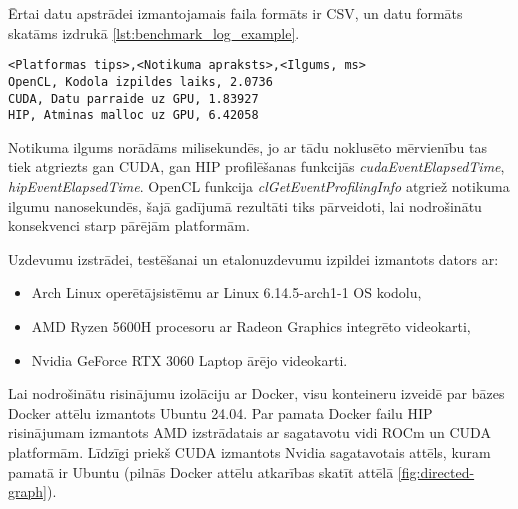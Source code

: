 Ērtai datu apstrādei izmantojamais faila formāts ir CSV, un datu formāts
skatāms izdrukā \ref{lst:benchmark_log_example}.
\begin{lstlisting}[caption={Etalonuzdevuma žurnālfaila ieraksta formāts},
  label=lst:benchmark_log_example,
  captionpos=b
]
<Platformas tips>,<Notikuma apraksts>,<Ilgums, ms>
OpenCL, Kodola izpildes laiks, 2.0736
CUDA, Datu parraide uz GPU, 1.83927
HIP, Atminas malloc uz GPU, 6.42058
\end{lstlisting}

Notikuma ilgums norādāms milisekundēs, jo ar tādu noklusēto mērvienību tas tiek
atgriezts gan CUDA, gan HIP profilēšanas funkcijās
\textit{cudaEventElapsedTime}, \textit{hipEventElapsedTime}. OpenCL funkcija
\textit{clGetEventProfilingInfo} atgriež notikuma ilgumu nanosekundēs, šajā
gadījumā rezultāti tiks pārveidoti, lai nodrošinātu konsekvenci starp pārējām
platformām.

Uzdevumu izstrādei, testēšanai un etalonuzdevumu izpildei izmantots dators ar:
\begin{itemize}
    \item Arch Linux operētājsistēmu ar Linux 6.14.5-arch1-1 OS kodolu,
    \item AMD Ryzen 5600H procesoru ar Radeon Graphics integrēto videokarti,
    \item Nvidia GeForce RTX 3060 Laptop ārējo videokarti.
\end{itemize}

Lai nodrošinātu risinājumu izolāciju ar Docker, visu konteineru izveidē par
bāzes Docker attēlu izmantots Ubuntu 24.04. Par pamata Docker failu HIP
risinājumam izmantots AMD izstrādatais \cite{amd_dockerfile} ar sagatavotu vidi
ROCm un CUDA platformām. Līdzīgi priekš CUDA izmantots Nvidia
sagatavotais attēls\cite{nvidia_dockerfile}, kuram pamatā ir Ubuntu (pilnās
Docker attēlu atkarības skatīt attēlā \ref{fig:directed-graph}).

